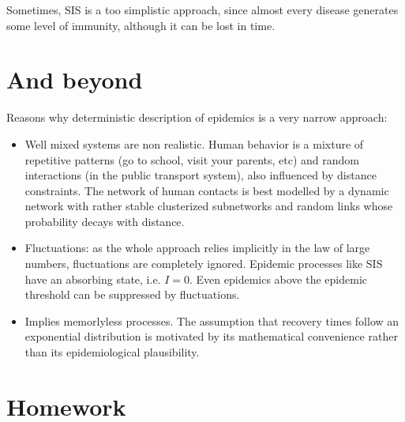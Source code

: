Sometimes, SIS is a too simplistic approach, since almost every disease generates some level of immunity, although it can be lost in time.

\section{And beyond}

Reasons why deterministic description of epidemics is a very narrow approach:
\begin{itemize}
 \item Well mixed systems are non realistic. Human behavior is a mixture of repetitive patterns (go to school, visit your parents, etc) and random interactions (in the public transport system), also influenced by distance constraints. The network of human contacts is best modelled by a dynamic network with rather stable clusterized subnetworks and random links whose probability decays with distance.
 \item Fluctuations: as the whole approach relies implicitly in the law of large numbers, fluctuations are completely ignored. Epidemic processes like SIS  have an absorbing state, i.e. $I=0$. Even epidemics above the epidemic threshold can be suppressed by fluctuations.
 \item Implies memorlyless processes. The assumption that recovery times follow an exponential distribution is motivated by its mathematical convenience rather than its epidemiological plausibility.
\end{itemize}



\section{Homework}

